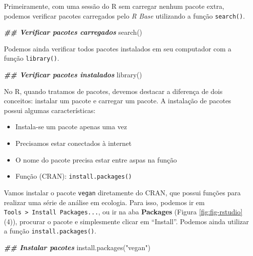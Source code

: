 \documentclass[
]{book}
\newenvironment{Shaded}{\begin{snugshade}}{\end{snugshade}}
\newcommand{\DocumentationTok}[1]{\textcolor[rgb]{0.37,0.37,0.37}{\textbf{\textit{#1}}}}
\newcommand{\FunctionTok}[1]{\textcolor[rgb]{0,0,0}{#1}}
\newcommand{\NormalTok}[1]{#1}
\newcommand{\StringTok}[1]{\textcolor[rgb]{0.5,0.5,0.5}{#1}}
\providecommand{\tightlist}{%
  \setlength{\itemsep}{0pt}\setlength{\parskip}{0pt}}
\begin{document}
Primeiramente, com uma sessão do R sem carregar nenhum pacote extra, podemos verificar pacotes carregados pelo \emph{R Base} utilizando a função \texttt{search()}.

\begin{Shaded}
\begin{Highlighting}[]
\DocumentationTok{\#\# Verificar pacotes carregados}
\FunctionTok{search}\NormalTok{()}
\end{Highlighting}
\end{Shaded}

Podemos ainda verificar todos pacotes instalados em seu computador com a função \texttt{library()}.

\begin{Shaded}
\begin{Highlighting}[]
\DocumentationTok{\#\# Verificar pacotes instalados}
\FunctionTok{library}\NormalTok{()}
\end{Highlighting}
\end{Shaded}

No R, quando tratamos de pacotes, devemos destacar a diferença de dois conceitos: instalar um pacote e carregar um pacote. A instalação de pacotes possui algumas características:

\begin{itemize}
\tightlist
\item
  Instala-se um pacote apenas uma vez
\item
  Precisamos estar conectados à internet
\item
  O nome do pacote precisa estar entre aspas na função
\item
  Função (CRAN): \texttt{install.packages()}
\end{itemize}

Vamos instalar o pacote \texttt{vegan} diretamente do CRAN, que possui funções para realizar uma série de análise em ecologia. Para isso, podemos ir em \texttt{Tools\ \textgreater{}\ Install\ Packages...}, ou ir na aba \textbf{Packages} (Figura \ref{fig:fig-rstudio} (4)), procurar o pacote e simplesmente clicar em ``Install''. Podemos ainda utilizar a função \texttt{install.packages()}.

\begin{Shaded}
\begin{Highlighting}[]
\DocumentationTok{\#\# Instalar pacotes}
\FunctionTok{install.packages}\NormalTok{(}\StringTok{"vegan"}\NormalTok{)}
\end{Highlighting}
\end{Shaded}
\end{document}
